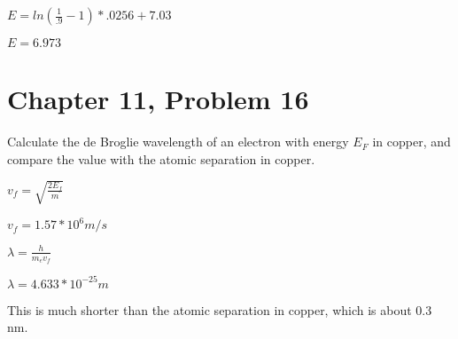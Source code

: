 \documentclass[12pt]{article}
\begin{document}
$E = ln(\frac{1}{.9} - 1)* .0256 + 7.03 $

$ E = 6.973 $

\section*{Chapter 11, Problem 16}

Calculate the de Broglie wavelength of an electron with energy $E_F$ in copper, and compare the value with the atomic separation in copper.

$ v_f = \sqrt{\frac{2E_f}{m}} $

$ v_f = 1.57 * 10^{6} m/s $

$ \lambda = \frac{h}{m_ev_f} $

$ \lambda = 4.633 * 10^{-25} m $

This is much shorter than the atomic separation in copper, which is about 0.3 nm.
\end{document}
